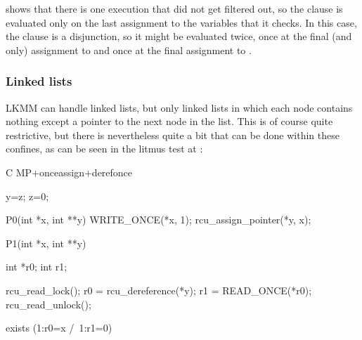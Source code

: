 \begin{fcvref}
 shows that there is one execution that did not get filtered out,
so the  clause is evaluated only on the last assignment to
the variables that it checks.
In this case, the  clause is a disjunction, so it might be
evaluated twice, once at the final (and only) assignment to 
and once at the final assignment to .
\end{fcvref}


\subsubsection{Linked lists}

LKMM can handle linked lists, but only linked lists in which each node
contains nothing except a pointer to the next node in the list.
This is of course quite restrictive, but there is nevertheless quite a
bit that can be done within these confines, as can be seen in the litmus
test at :

\begin{fcvlabel}
\begin{VerbatimN}[commandchars=\%\@\$]
	C MP+onceassign+derefonce

	{
	y=z;     %
	z=0;     %
	}

	P0(int *x, int **y)
	{
		WRITE_ONCE(*x, 1);           %
		rcu_assign_pointer(*y, x);   %
	}

	P1(int *x, int **y)
	{
		int *r0;
		int r1;

		rcu_read_lock();             %
		r0 = rcu_dereference(*y);    %
		r1 = READ_ONCE(*r0);         %
		rcu_read_unlock();           %
	}

	exists (1:r0=x /\ 1:r1=0)
\end{VerbatimN}
\end{fcvlabel}

